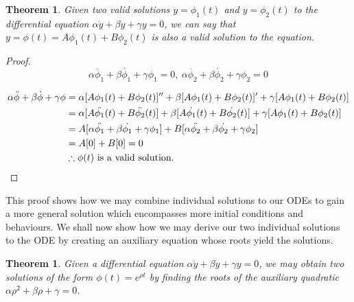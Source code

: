 \documentclass{article}
\begin{document}
\newtheorem*{odeLinear}{Theorem}

\begin{odeLinear}
Given two valid solutions $y = \phi_1(t)$ and $y = \phi_2(t)$ to the differential equation $\alpha\ddot{y} + \beta\dot{y} + \gamma y = 0$, we can say that $y = \phi(t) = A\phi_1(t) + B\phi_2(t)$ is also a valid solution to the equation.
\end{odeLinear}

\begin{proof}
	\begin{equation*}
		\alpha\ddot{\phi_1} + \beta\dot{\phi_1} + \gamma\phi_1 = 0, \: \alpha\ddot{\phi_2} + \beta\dot{\phi_2} + \gamma\phi_2 = 0
	\end{equation*}

	\begin{align*}
			\alpha\ddot{\phi} + \beta\dot{\phi} + \gamma\phi &= \alpha[A\phi_1(t) + B\phi_2(t)]'' + \beta[A\phi_1(t) + B\phi_2(t)]' + \gamma[A\phi_1(t) + B\phi_2(t)] \\
			&= \alpha[A\ddot{\phi_1}(t) + B\ddot{\phi_2}(t)] + \beta[A\dot{\phi_1}(t) + B\dot{\phi_2}(t)] + \gamma[A\phi_1(t) + B\phi_2(t)] \\
			&= A[\alpha\ddot{\phi_1} + \beta\dot{\phi_1} + \gamma\phi_1 ] + B[\alpha\ddot{\phi_2} + \beta\dot{\phi_2} + \gamma\phi_2] \\
			&= A[0] + B[0] = 0 \\
			& \therefore \phi(t) \textnormal{ is a valid solution.}
	\end{align*}
\end{proof}

This proof shows how we may combine individual solutions to our ODEs to gain a more general solution which encompasses more initial conditions and behaviours. We shall now show how we may derive our two individual solutions to the ODE by creating an auxiliary equation whose roots yield the solutions.

\newtheorem*{odeAux}{Theorem}

\begin{odeAux}
Given a differential equation $\alpha\ddot{y} + \beta\dot{y} + \gamma y = 0$, we may obtain two solutions of the form $\phi(t) = e^{\rho t}$ by finding the roots of the auxiliary quadratic $\alpha\rho^2 + \beta\rho + \gamma = 0$.
\end{odeAux}
\end{document}
